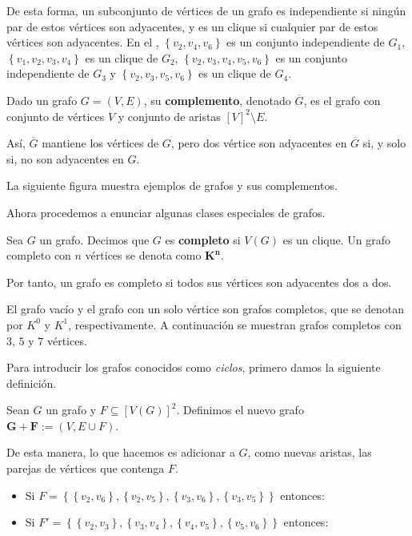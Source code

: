 De esta forma, un subconjunto de vértices de un grafo es independiente si ningún par de estos vértices son adyacentes, y es un clique si cualquier par de estos vértices son adyacentes. En el , $\left\lbrace v_2,v_4,v_6\right\rbrace$ es un conjunto independiente de $G_1$, $\left\lbrace v_1,v_2,v_3,v_4\right\rbrace$ es un clique de $G_2$, $\left\lbrace v_2,v_3,v_4,v_5,v_6\right\rbrace$ es un conjunto independiente de $G_3$ y $\left\lbrace v_2,v_3,v_5,v_6\right\rbrace$ es un clique de $G_4$.
\begin{Def}
   Dado un grafo $G=(V,E)$, su \textbf{complemento}, denotado $\overline{G}$, es el grafo con conjunto de vértices $V$ y conjunto de aristas $[V]^2\setminus E$. 
\end{Def}
Así, $\overline{G}$ mantiene los vértices de $G$, pero dos vértice son adyacentes en $\overline{G}$ si, y solo si, no son adyacentes en $G$.
\begin{Ejm}
   La siguiente figura muestra ejemplos de grafos y sus complementos.
   
\end{Ejm}
Ahora procedemos a enunciar algunas clases especiales de grafos.
\begin{Def}
   Sea $G$ un grafo. Decimos que $G$ es \textbf{completo} si $V(G)$ es un clique. Un grafo completo con $n$ vértices se denota como $\bm{K^n}$.
\end{Def}
Por tanto, un grafo es completo si todos sus vértices son adyacentes dos a dos.
\begin{Ejm}
   El grafo vacío y el grafo con un solo vértice son grafos completos, que se denotan por $K^0$ y $K^1$, respectivamente. A continuación se muestran grafos completos con $3$, $5$ y $7$ vértices.
   
\end{Ejm}
Para introducir los grafos conocidos como \textit{ciclos}, primero damos la siguiente definición.
\begin{Def}
   Sean $G$ un grafo y $F\subseteq [V(G)]^2$. Definimos el nuevo grafo $\bm{G+F}:=(V,E\cup F)$.
\end{Def}
De esta manera, lo que hacemos es adicionar a $G$, como nuevas aristas, las parejas de vértices que contenga $F$.
\begin{Ejm}
   \phantom{0}
   \begin{itemize}
      \item Si $F=\left\lbrace \left\lbrace v_2,v_6\right\rbrace, \left\lbrace v_2,v_5\right\rbrace, \left\lbrace v_3,v_6\right\rbrace, \left\lbrace v_3,v_5\right\rbrace\right\rbrace$ entonces:  
           
      \item Si $F'=\left\lbrace \left\lbrace v_2,v_3\right\rbrace, \left\lbrace v_3,v_4\right\rbrace, \left\lbrace v_4,v_5\right\rbrace, \left\lbrace v_5,v_6 \right\rbrace\right\rbrace$ entonces:
         \vspace{1em}
           
   \end{itemize}
\end{Ejm}
